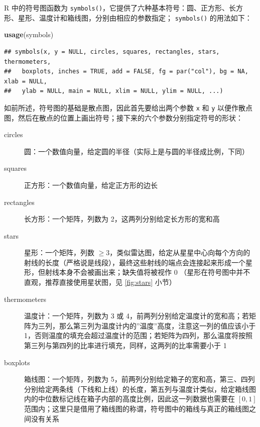 \documentclass[
  b5paper,
  UTF8,twoside]{book}
\newenvironment{Shaded}{\begin{snugshade}}{\end{snugshade}}
\newcommand{\FunctionTok}[1]{\textcolor[rgb]{0.13,0.29,0.53}{\textbf{#1}}}
\newcommand{\NormalTok}[1]{#1}
\begin{document}
R 中的符号图函数为 \texttt{symbols()}，它提供了六种基本符号：圆、正方形、长方形、星形、温度计和箱线图，分别由相应的参数指定； \texttt{symbols()} 的用法如下：

\begin{Shaded}
\begin{Highlighting}[]
\FunctionTok{usage}\NormalTok{(symbols)}
\end{Highlighting}
\end{Shaded}

\begin{verbatim}
## symbols(x, y = NULL, circles, squares, rectangles, stars, thermometers,
##   boxplots, inches = TRUE, add = FALSE, fg = par("col"), bg = NA, xlab = NULL,
##   ylab = NULL, main = NULL, xlim = NULL, ylim = NULL, ...)
\end{verbatim}

如前所述，符号图的基础是散点图，因此首先要给出两个参数 \texttt{x} 和 \texttt{y} 以便作散点图，然后在散点的位置上画出符号；接下来的六个参数分别指定符号的形状：

\begin{description}
\item[circles]
圆：一个数值向量，给定圆的半径（实际上是与圆的半径成比例，下同）
\item[squares]
正方形：一个数值向量，给定正方形的边长
\item[rectangles]
长方形：一个矩阵，列数为 2，这两列分别给定长方形的宽和高
\item[stars]
星形：一个矩阵，列数 \(\geq3\)，类似雷达图，给定从星星中心向每个方向的射线的长度（严格说是线段），最终这些射线的端点会连接起来形成一个星形，但射线本身不会被画出来；缺失值将被视作 0 （星形在符号图中并不直观，推荐直接使用星状图，见 \ref{fig:stars} 小节）
\item[thermometers]
温度计：一个矩阵，列数为 3 或 4，前两列分别给定温度计的宽和高；若矩阵为三列，那么第三列为温度计内的''温度''高度，注意这一列的值应该小于 1，否则温度的填充会超过温度计的范围；若矩阵为四列，那么温度将按照第三列与第四列的比率进行填充，同样，这两列的比率需要小于 1
\item[boxplots]
箱线图：一个矩阵，列数为 5，前两列分别给定箱子的宽和高，第三、四列分别给定两条线（下线和上线）的长度，第五列与温度计类似，给定箱线图内的中位数标记线在箱子内部的高度比例，因此这一列数据也需要在 \([0,1]\) 范围内；这里只是借用了箱线图的称谓，符号图中的箱线与真正的箱线图之间没有关系
\end{description}
\end{document}
